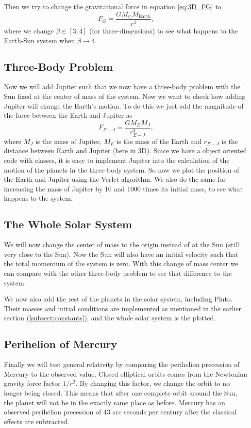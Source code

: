 \documentclass[12pt,a4paper,english]{article}
\begin{document}
Then we try to change the gravitational force in equation \ref{eq:3D_FG} to 
\begin{equation}
\label{eq:change_beta}
F_G=\frac{GM_{\odot}M_{\text{Earth}}}{r^{\beta}},
\end{equation}
where we change $\beta\in[3,4]$ (for three-dimensions) to see what happens to the Earth-Sun system when $\beta\rightarrow4$.

\subsection{Three-Body Problem}
\label{eq:Add Jupiter}
Now we will add Jupiter such that we now have a three-body problem with the Sun fixed at the center of mass of the system. Now we want to check how adding Jupiter will change the Earth's motion. To do this we just add the magnitude of the force between the Earth and Jupiter as
\begin{equation}
\label{eq:Earth-Jupiter}
F_{E-J}=\frac{GM_EM_J}{r^3_{E-J}},
\end{equation}
where $M_J$ is the mass of Jupiter, $M_E$ is the mass of the Earth and $r_{E-J}$ is the distance between Earth and Jupiter (here in 3D). Since we have a object oriented code with classes, it is easy to implement Jupiter into the calculation of the motion of the planets in the three-body system. So now we plot the position of the Earth and Jupiter using the Verlet algorithm. We also do the same for increasing the mass of Jupiter by 10 and 1000 times its initial mass, to see what happens to the system.

\subsection{The Whole Solar System}
\label{eq:SolarSystem}
We will now change the center of mass to the origin instead of at the Sun (still very close to the Sun). Now the Sun will also have an initial velocity such that the total momentum of the system is zero. With this change of mass center we can compare with the other three-body problem to see that difference to the system.

We now also add the rest of the planets in the solar system, including Pluto. Their masses and initial conditions are implemented as mentioned in the earlier section (\ref{subsect:constants}), and the whole solar system is the plotted.

\subsection{Perihelion of Mercury}
\label{eq:Mercury}
Finally we will test general relativity by comparing the perihelion precession of Mercury to the observed value. Closed elliptical orbits comes from the Newtonian gravity force factor $1/r^2$. By changing this factor, we change the orbit to no longer being closed. This means that after one complete orbit around the Sun, the planet will not be in the exactly same place as before. Mercury has an observed perihelion precession of 43 arc seconds per century after the classical effects are subtracted. 
\end{document}
